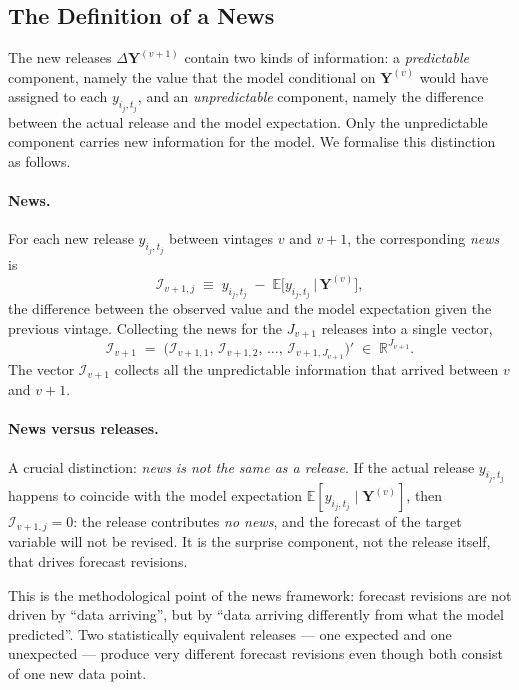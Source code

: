 \documentclass[11pt, a4paper, oneside]{article}
\begin{document}
\newpage 

\subsection{The Definition of a News}

The new releases $\Delta \mathbf{Y}^{(v+1)}$ contain two kinds of
information: a \emph{predictable} component, namely the value that
the model conditional on $\mathbf{Y}^{(v)}$ would have assigned to
each $y_{i_j, t_j}$, and an \emph{unpredictable} component, namely
the difference between the actual release and the model expectation.
Only the unpredictable component carries new information for the
model. We formalise this distinction as follows.

\paragraph{News.}
For each new release $y_{i_j, t_j}$ between vintages $v$ and $v+1$,
the corresponding \emph{news} is
\begin{equation}
\mathcal{I}_{v+1, j} \;\equiv\; y_{i_j, t_j} \;-\; \mathbb{E}\!\big[y_{i_j, t_j} \,\big|\, \mathbf{Y}^{(v)}\big],
\label{eq:news-definition}
\end{equation}
the difference between the observed value and the model expectation
given the previous vintage. Collecting the news for the $J_{v+1}$
releases into a single vector,
\begin{equation}
\mathcal{I}_{v+1} \;=\; \big(\mathcal{I}_{v+1, 1},\, \mathcal{I}_{v+1, 2},\, \ldots,\, \mathcal{I}_{v+1, J_{v+1}}\big)' \;\in\; \mathbb{R}^{J_{v+1}}.
\label{eq:news-vector}
\end{equation}
The vector $\mathcal{I}_{v+1}$ collects all the unpredictable
information that arrived between $v$ and $v+1$.

\paragraph{News versus releases.}
A crucial distinction: \emph{news is not the same as a release}. If
the actual release $y_{i_j, t_j}$ happens to coincide with the model
expectation $\mathbb{E}[y_{i_j, t_j} \mid \mathbf{Y}^{(v)}]$, then
$\mathcal{I}_{v+1, j} = 0$: the release contributes \emph{no news},
and the forecast of the target variable will not be revised. It is
the surprise component, not the release itself, that drives forecast
revisions.

This is the methodological point of the news framework: forecast
revisions are not driven by ``data arriving'', but by ``data
arriving differently from what the model predicted''. Two
statistically equivalent releases — one expected and one
unexpected — produce very different forecast revisions even though
both consist of one new data point.
\end{document}
